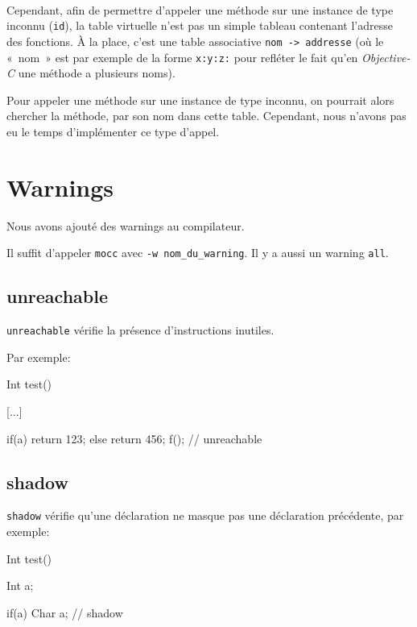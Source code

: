 \documentclass{scrartcl}
\newcommand{\mocc}{\texttt{mocc}}
\newcommand{\objc}{\textit{Objective-C}}
\begin{document}
      \paragraph{}
      Cependant, afin de permettre d'appeler une méthode sur une instance de
      type inconnu (\verb+id+), la table virtuelle n'est pas un simple tableau
      contenant l'adresse des fonctions. À la place, c'est une table
      associative \verb+nom -> addresse+ (où le «~nom~» est par exemple de la
      forme \verb+x:y:z:+ pour refléter le fait qu'en \objc{} une méthode a
      plusieurs noms).

      Pour appeler une méthode sur une instance de type inconnu, on pourrait
      alors chercher la méthode, par son nom dans cette table. Cependant, nous
      n'avons pas eu le temps d'implémenter ce type d'appel.

\section{Warnings}
  Nous avons ajouté des warnings au compilateur.

  Il suffit d'appeler \mocc{} avec \verb+-w nom_du_warning+.
  Il y a aussi un warning \verb+all+.

  \subsection{unreachable}
    \verb"unreachable" vérifie la présence d'instructions inutiles.

    Par exemple:
    \begin{moccode}
Int test() {
    [...]

    if(a) {
        return 123;
    }
    else {
        return 456;
    }
    f(); // unreachable
}
    \end{moccode}

  \subsection{shadow}
    \verb"shadow" vérifie qu'une déclaration ne masque pas une déclaration
    précédente, par exemple:
    \begin{moccode}
Int test() {
    Int a;

    if(a) {
        Char a; // shadow
    }
}
    \end{moccode}
\end{document}
